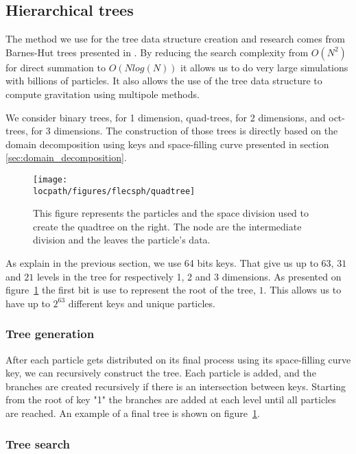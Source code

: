 \subsection{Hierarchical trees}
\label{sec:trees}

The method we use for the tree data structure creation and research comes from Barnes-Hut trees presented in \cite{barnes1986hierarchical,barnes1990modified}. 
By reducing the search complexity from $O(N^2)$ for direct summation to $O(Nlog(N))$ it allows us to do very large simulations with billions of particles. 
It also allows the use of the tree data structure to compute gravitation using multipole methods.

We consider binary trees, for 1 dimension, quad-trees, for 2 dimensions, and oct-trees, for 3 dimensions. 
The construction of those trees is directly based on the domain decomposition using keys and space-filling curve presented in section \ref{sec:domain_decomposition}. 

\begin{figure}[t!]
\centering
\texttt{[image: \\locpath/figures/flecsph/quadtree]}
\caption[Particles and quadtree representation. ]{This figure represents the particles and the space division used to create the quadtree on the right. The node are the intermediate division and the leaves the particle's data.}
\label{fig:quadtree}
\end{figure}

As explain in the previous section, we use 64 bits keys.
That give us up to $63$, $31$ and $21$ levels in the tree for respectively 1, 2 and 3 dimensions. 
As presented on figure~\ref{fig:quadtree} the first bit is use to represent the root of the tree, $1$.
This allows us to have up to $2^{63}$ different keys and unique particles.  

\subsubsection{Tree generation}

After each particle gets distributed on its final process using its space-filling curve key, we can recursively construct the tree.
Each particle is added, and the branches are created recursively if there is an intersection between keys. 
Starting from the root of key "1" the branches are added at each level until all particles are reached.
An example of a final tree is shown on figure~\ref{fig:quadtree}.

\subsubsection{Tree search}

